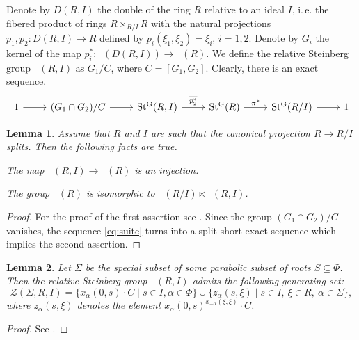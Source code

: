\documentclass[oneside,12pt]{amsart}
\numberwithin{equation}{section}
\newtheorem{lem}{Lemma}
\numberwithin{lem}{section}
\theoremstyle{definition}
\theoremstyle{remark}
\DeclareMathOperator{\St}{St^G}
\begin{document}
Denote by $D(R, I)$ the double of the ring $R$ relative to an ideal $I$, i.\,e. the fibered product of rings
$R \times_{R/I} R$ with the natural projections $p_1, p_2 \colon D(R, I) \to R$ defined by $p_i(\xi_1, \xi_2) = \xi_i$, $i=1,2$.
Denote by $G_i$ the kernel of the map $p_i^*\colon\St(D(R, I)) \to \St(R)$.
We define the relative Steinberg group $\St(R, I)$ as $G_1 / C$, where $C = [G_1, G_2]$.
Clearly, there is an exact sequence.
\begin{equation} \label{eq:suite} \begin{tikzcd} 1 \ar[r] & (G_1\cap G_2)/C \ar[r] & \St(R, I) \ar[r, "\overline{p_2^*}"] & \St(R) \ar[r, "\pi^*"] & \St(R/I) \ar[r] & 1 \end{tikzcd} \end{equation}

\begin{lem} 
 Assume that $R$ and $I$ are such that the canonical projection $ R \to R/I $ splits.
 Then the following facts are true.
 \begin{lemlist}
   \item \label{item:st-inj} The map $\St(R, I) \rightarrow \St(R)$ is an injection.
   \item \label{item:st-semi} The group $\St(R)$ is isomorphic to $\St(R/I) \ltimes \St(R, I)$.
 \end{lemlist}
\end{lem}
\begin{proof}
 For the proof of the first assertion see \cite[Lemma~8]{S15}.
 Since the group $(G_1 \cap G_2)/C$ vanishes, the sequence \eqref{eq:suite} turns into a split short exact sequence which implies the second assertion.
\end{proof}

\begin{lem} \label{lem:Zgen}
 Let $\Sigma$ be the special subset of some parabolic subset of roots $S \subseteq \Phi$.
 Then the relative Steinberg group $\St(R, I)$ admits the following generating set:
 \[ \mathcal{Z}(\Sigma, R, I) =  \{ x_\alpha(0,s) \cdot C \mid s\in I, \alpha \in \Phi \} \cup \{ z_\alpha(s, \xi) \mid s\in I, \ \xi \in R, \ \alpha \in \Sigma\},\]
 where $z_\alpha(s, \xi)$ denotes the element $x_\alpha(0, s)^{x_{-\alpha}(\xi, \xi)} \cdot C$.
\end{lem}
\begin{proof}
 See \cite[Lemma~5]{S15}.
\end{proof}
\end{document}
